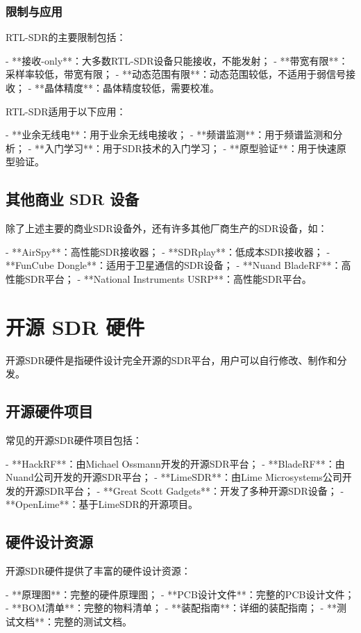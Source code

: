 ﻿\documentclass[UTF8]{ctexbook}
\begin{document}
\subsubsection{限制与应用}

RTL-SDR的主要限制包括：

- **接收-only**：大多数RTL-SDR设备只能接收，不能发射；
- **带宽有限**：采样率较低，带宽有限；
- **动态范围有限**：动态范围较低，不适用于弱信号接收；
- **晶体精度**：晶体精度较低，需要校准。

RTL-SDR适用于以下应用：

- **业余无线电**：用于业余无线电接收；
- **频谱监测**：用于频谱监测和分析；
- **入门学习**：用于SDR技术的入门学习；
- **原型验证**：用于快速原型验证。

\subsection{其他商业 SDR 设备}

除了上述主要的商业SDR设备外，还有许多其他厂商生产的SDR设备，如：

- **AirSpy**：高性能SDR接收器；
- **SDRplay**：低成本SDR接收器；
- **FunCube Dongle**：适用于卫星通信的SDR设备；
- **Nuand BladeRF**：高性能SDR平台；
- **National Instruments USRP**：高性能SDR平台。

\section{开源 SDR 硬件}

开源SDR硬件是指硬件设计完全开源的SDR平台，用户可以自行修改、制作和分发。

\subsection{开源硬件项目}

常见的开源SDR硬件项目包括：

- **HackRF**：由Michael Ossmann开发的开源SDR平台；
- **BladeRF**：由Nuand公司开发的开源SDR平台；
- **LimeSDR**：由Lime Microsystems公司开发的开源SDR平台；
- **Great Scott Gadgets**：开发了多种开源SDR设备；
- **OpenLime**：基于LimeSDR的开源项目。

\subsection{硬件设计资源}

开源SDR硬件提供了丰富的硬件设计资源：

- **原理图**：完整的硬件原理图；
- **PCB设计文件**：完整的PCB设计文件；
- **BOM清单**：完整的物料清单；
- **装配指南**：详细的装配指南；
- **测试文档**：完整的测试文档。
\end{document}
